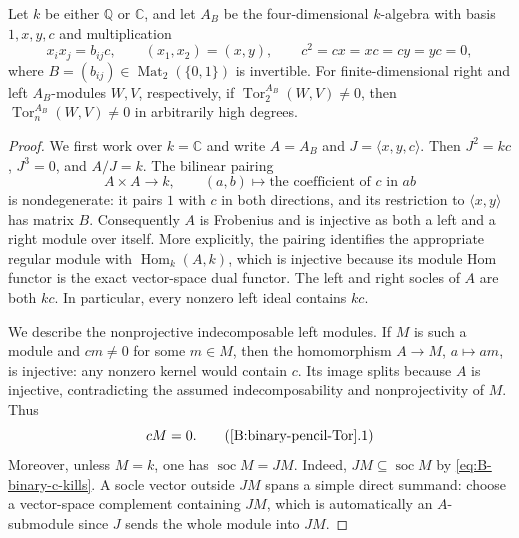 \begin{lemma}
\label{B:binary-pencil-Tor}
Let $k$ be either $\mathbb Q$ or $\mathbb C$, and let $A_B$ be the
four-dimensional $k$-algebra with basis $1,x,y,c$ and multiplication
\[
 x_i x_j=b_{ij}c,\qquad (x_1,x_2)=(x,y),\qquad
 c^2=cx=xc=cy=yc=0,
\]
where $B=(b_{ij})\in\operatorname{Mat}_2(\{0,1\})$ is invertible.
For finite-dimensional right and left $A_B$-modules $W,V$, respectively,
if $\operatorname{Tor}_2^{A_B}(W,V)\ne0$, then
$\operatorname{Tor}_n^{A_B}(W,V)\ne0$ in arbitrarily high degrees.
\end{lemma}

\begin{proof}
We first work over $k=\mathbb C$ and write $A=A_B$ and
$J=\langle x,y,c\rangle$.  Then $J^2=kc$, $J^3=0$, and $A/J=k$.
The bilinear pairing
\[
 A\times A\longrightarrow k,\qquad
 (a,b)\longmapsto\text{the coefficient of $c$ in $ab$}
\]
is nondegenerate: it pairs $1$ with $c$ in both directions, and its
restriction to $\langle x,y\rangle$ has matrix $B$.
Consequently $A$ is Frobenius and is injective as both a left and a
right module over itself.  More explicitly, the pairing identifies
the appropriate regular module with $\operatorname{Hom}_k(A,k)$,
which is injective because its module Hom functor is the exact
vector-space dual functor.  The left and right socles of $A$ are
both $kc$.  In particular, every nonzero left ideal contains $kc$.

We describe the nonprojective indecomposable left modules.
If $M$ is such a module and $cm\ne0$ for some $m\in M$, then
the homomorphism $A\to M$, $a\mapsto am$, is injective: any
nonzero kernel would contain $c$.  Its image splits because $A$
is injective, contradicting the assumed indecomposability and
nonprojectivity of $M$.  Thus
\[
 cM=0.                                                     \tag{\ref{B:binary-pencil-Tor}.1}\label{eq:B-binary-c-kills}
\]
Moreover, unless $M=k$, one has $\operatorname{soc}M=JM$.
Indeed, $JM\subseteq\operatorname{soc}M$ by
\eqref{eq:B-binary-c-kills}.  A socle
vector outside $JM$ spans a simple direct summand: choose a
vector-space complement containing $JM$, which is automatically
an $A$-submodule since $J$ sends the whole module into $JM$.


\end{proof}
